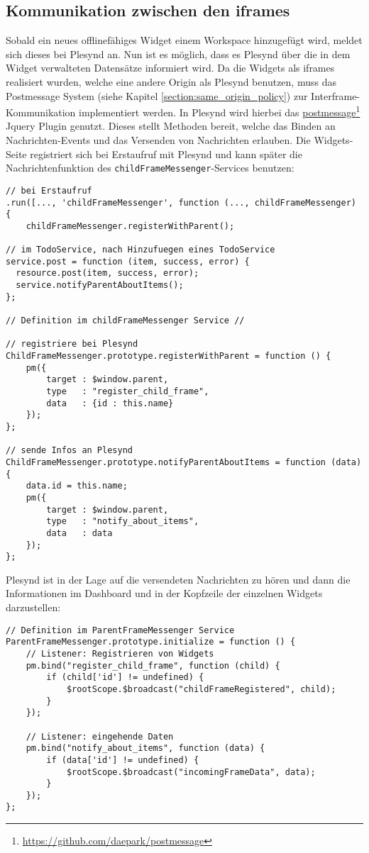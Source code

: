 \subsection{Kommunikation zwischen den iframes}\label{section:kommunikation_zwischen_iframes_implementierung}
Sobald ein neues offlinefähiges Widget einem Workspace hinzugefügt wird, meldet sich dieses bei Plesynd an. Nun ist es möglich, dass es Plesynd über die in dem Widget verwalteten Datensätze informiert wird. Da die Widgets als iframes realisiert wurden, welche eine andere Origin als Plesynd benutzen, muss das Postmessage System (siehe Kapitel \ref{section:same_origin_policy}) zur Interframe-Kommunikation implementiert werden. In Plesynd wird hierbei das \href{https://github.com/daepark/postmessage}{postmessage}\footnote{\url{https://github.com/daepark/postmessage}} Jquery Plugin genutzt. Dieses stellt Methoden bereit, welche das Binden an Nachrichten-Events und das Versenden von Nachrichten erlauben. Die Widgets-Seite registriert sich bei Erstaufruf mit Plesynd und kann später die Nachrichtenfunktion des \texttt{childFrameMessenger}-Services benutzen:
\begin{lstlisting}
// bei Erstaufruf
.run([..., 'childFrameMessenger', function (..., childFrameMessenger) {
    childFrameMessenger.registerWithParent();
    
// im TodoService, nach Hinzufuegen eines TodoService
service.post = function (item, success, error) {
  resource.post(item, success, error);
  service.notifyParentAboutItems();
};
   
// Definition im childFrameMessenger Service //

// registriere bei Plesynd
ChildFrameMessenger.prototype.registerWithParent = function () {
    pm({
        target : $window.parent,
        type   : "register_child_frame",
        data   : {id : this.name}
    });
};

// sende Infos an Plesynd
ChildFrameMessenger.prototype.notifyParentAboutItems = function (data) {
    data.id = this.name;
    pm({
        target : $window.parent,
        type   : "notify_about_items",
        data   : data
    });
};
\end{lstlisting}

Plesynd ist in der Lage auf die versendeten Nachrichten zu hören und dann die Informationen im Dashboard und in der Kopfzeile der einzelnen Widgets darzustellen:
\begin{lstlisting}
// Definition im ParentFrameMessenger Service
ParentFrameMessenger.prototype.initialize = function () {
    // Listener: Registrieren von Widgets
    pm.bind("register_child_frame", function (child) {
        if (child['id'] != undefined) {
            $rootScope.$broadcast("childFrameRegistered", child);
        }
    });

    // Listener: eingehende Daten
    pm.bind("notify_about_items", function (data) {
        if (data['id'] != undefined) {
            $rootScope.$broadcast("incomingFrameData", data);
        }
    });
};
\end{lstlisting}

